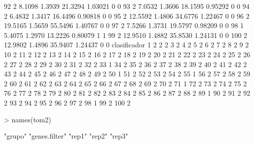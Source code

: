 \documentclass[12pt]{article}
\begin{document}
\begin{Schunk}
\begin{Soutput}
92             2  8.1098 1.3939 21.3294 1.03021         0         0
93             2  7.0532 1.3606 18.1595 0.95292         0         0
94             2  6.4832 1.3417 16.4496 0.90818         0         0
95             2 12.5592 1.4806 34.6776 1.22467         0         0
96             2 19.5165 1.5659 55.5496 1.40767         0         0
97             2  7.5266 1.3731 19.5797 0.98209         0         0
98             1  5.4075 1.2970 13.2226 0.80079         1         1
99             2 12.9510 1.4882 35.8530 1.24131         0         0
100            2 12.9802 1.4896 35.9407 1.24437         0         0
    clasificador
1              2
2              2
3              2
4              2
5              2
6              2
7              2
8              2
9              2
10             2
11             2
12             2
13             2
14             2
15             2
16             2
17             2
18             2
19             2
20             2
21             2
22             2
23             2
24             2
25             2
26             2
27             2
28             2
29             2
30             2
31             2
32             2
33             1
34             2
35             2
36             2
37             2
38             2
39             2
40             2
41             2
42             2
43             2
44             2
45             2
46             2
47             2
48             2
49             2
50             1
51             2
52             2
53             2
54             2
55             1
56             2
57             2
58             2
59             2
60             2
61             2
62             2
63             2
64             2
65             2
66             2
67             2
68             2
69             2
70             2
71             1
72             2
73             2
74             2
75             2
76             2
77             2
78             2
79             2
80             2
81             2
82             2
83             2
84             2
85             2
86             2
87             2
88             2
89             1
90             2
91             2
92             2
93             2
94             2
95             2
96             2
97             2
98             1
99             2
100            2
\end{Soutput}
\begin{Sinput}
> names(tom2)
\end{Sinput}
\begin{Soutput}
 [1] "grupo"        "genes.filter" "rep1"         "rep2"         "rep3"        

\end{Soutput}
\end{Schunk}
\end{document}
